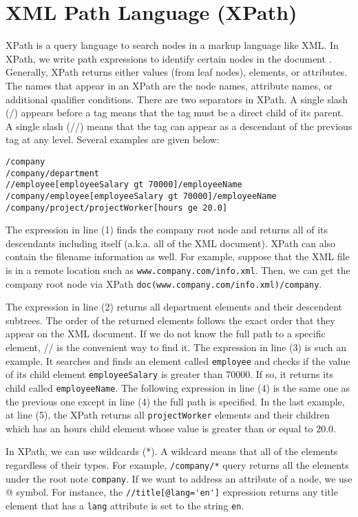 \chapter{XML Path Language (XPath)}
\label{ch:appendix-xpath}
XPath is a query language to search nodes in a markup language like XML. In XPath, we write path expressions to identify certain nodes in the document \autocite{elmasri2014}. Generally, XPath returns either values (from leaf nodes), elements, or attributes. The names that appear in an XPath are the node names, attribute names, or additional qualifier conditions. There are two separators in XPath. A single slash (/) appears before a tag means that the tag must be a direct child of its parent. A single slash (//) means that the tag can appear as a descendant of the previous tag at any level. Several examples are given below:

\begin{lstlisting}[language={},caption={Several examples of XPath from Elmasri et al..}]
/company
/company/department
//employee[employeeSalary gt 70000]/employeeName
/company/employee[employeeSalary gt 70000]/employeeName
/company/project/projectWorker[hours ge 20.0]
\end{lstlisting}

The expression in line (1) finds the company root node and returns all of its descendants including itself (a.k.a. all of the XML document). XPath can also contain the filename information as well. For example, suppose that the XML file is in a remote location such as \lstinline[language={}]!www.company.com/info.xml!. Then, we can get the company root node via XPath \lstinline[language={}]!doc(www.company.com/info.xml)/company!.

The expression in line (2) returns all department elements and their descendent subtrees. The order of the returned elements follows the exact order that they appear on the XML document. If we do not know the full path to a specific element, // is the convenient way to find it. The expression in line (3) is such an example. It searches and finds an element called \lstinline[language={}]!employee! and checks if the value of its child element \lstinline[language={}]!employeeSalary! is greater than 70000. If so, it returns its child called \lstinline[language={}]!employeeName!. The following expression in line (4) is the same one as the previous one except in line (4) the full path is specified. In the last example, at line (5),  the XPath returns all \lstinline[language={}]!projectWorker! elements and their children which has an hours child element whose value is greater than or equal to 20.0.

In XPath, we can use wildcards (*). A wildcard means that all of the elements regardless of their types. For example, \lstinline[language={}]!/company/*! query returns all the elements under the root note \lstinline[language={}]!company!. If we want to address an attribute of a node, we use @ symbol. For instance, the \lstinline[language={}]!//title[@lang='en']! expression returns any title element that has a \lstinline[language={}]!lang! attribute is set to the string \lstinline[language={}]!en!.